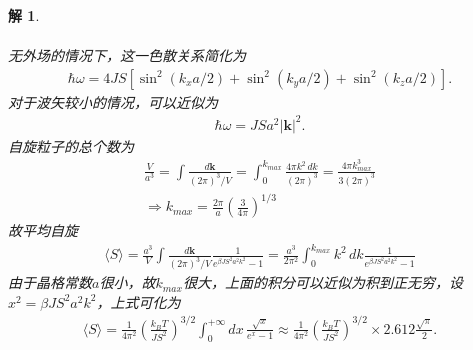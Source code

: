 \documentclass[UTF8,10pt,a4paper]{article}
\theoremstyle{Problem}
\theoremstyle{Solution}
\newtheorem*{sol}{解}
\providecommand{\abs}[1]{\left\lvert#1\right\rvert}
\begin{document}
\begin{sol}
\begin{enumerate}
\begin{align}
        \end{align}
        无外场的情况下，这一色散关系简化为
        \begin{align}
            \hbar\omega=4JS[\sin^2(k_xa/2)+\sin^2(k_ya/2)+\sin^2(k_za/2)].
        \end{align}
        对于波矢较小的情况，可以近似为
        \begin{align}
            \hbar\omega=JSa^2\abs{\bm{k}}^2.
        \end{align}
        自旋粒子的总个数为
        \begin{gather}
            \frac{V}{a^3}=\int\frac{d\bm{k}}{(2\pi)^3/V}=\int_0^{k_{max}}\frac{4\pi k^2\,dk}{(2\pi)^3}=\frac{4\pi k_{max}^3}{3(2\pi)^3}\\
            \Longrightarrow k_{max}=\frac{2\pi}{a}\left(\frac{3}{4\pi}\right)^{1/3}
        \end{gather}
        故平均自旋
        \begin{align}
            \langle S\rangle=\frac{a^3}{V}\int\frac{d\bm{k}}{(2\pi)^3/V}\frac{1}{e^{\beta JS^2a^2k^2}-1}=\frac{a^3}{2\pi^2}\int_0^{k_{max}}k^2\,dk\frac{1}{e^{\beta JS^2a^2k^2}-1}
        \end{align}
        由于晶格常数$a$很小，故$k_{max}$很大，上面的积分可以近似为积到正无穷，设$x^2=\beta JS^2a^2k^2$，上式可化为
        \begin{align}
            \langle S\rangle=\frac{1}{4\pi^2}\left(\frac{k_BT}{JS^2}\right)^{3/2}\int_0^{+\infty}dx\,\frac{\sqrt{x}}{e^{x}-1}\approx\frac{1}{4\pi^2}\left(\frac{k_BT}{JS^2}\right)^{3/2}\times 2.612\frac{\sqrt{\pi}}{2}.
        \end{align}
    \end{enumerate}
\end{sol}
\end{document}
